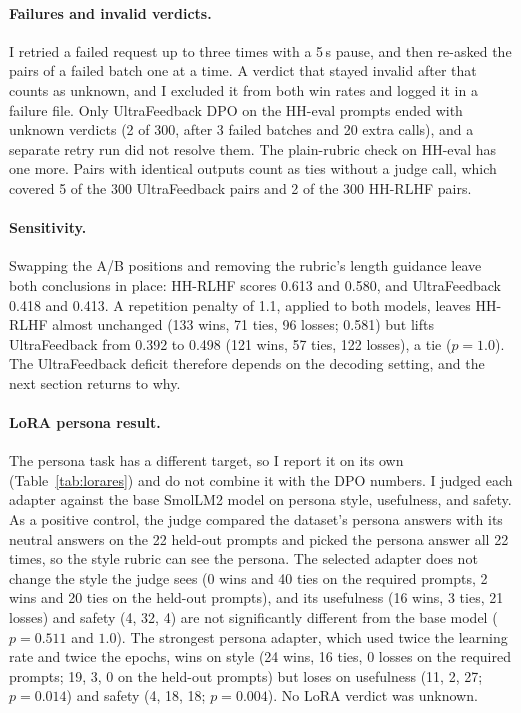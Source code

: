 \paragraph{Failures and invalid verdicts.} I retried a failed request up to three times with a 5\,s pause, and then re-asked the pairs of a failed batch one at a time. A verdict that stayed invalid after that counts as unknown, and I excluded it from both win rates and logged it in a failure file. Only UltraFeedback DPO on the HH-eval prompts ended with unknown verdicts (2 of 300, after 3 failed batches and 20 extra calls), and a separate retry run did not resolve them. The plain-rubric check on HH-eval has one more. Pairs with identical outputs count as ties without a judge call, which covered 5 of the 300 UltraFeedback pairs and 2 of the 300 HH-RLHF pairs.

\paragraph{Sensitivity.} Swapping the A/B positions and removing the rubric's length guidance leave both conclusions in place: HH-RLHF scores 0.613 and 0.580, and UltraFeedback 0.418 and 0.413. A repetition penalty of 1.1, applied to both models, leaves HH-RLHF almost unchanged (133 wins, 71 ties, 96 losses; 0.581) but lifts UltraFeedback from 0.392 to 0.498 (121 wins, 57 ties, 122 losses), a tie ($p=1.0$). The UltraFeedback deficit therefore depends on the decoding setting, and the next section returns to why.

\paragraph{LoRA persona result.} The persona task has a different target, so I report it on its own (Table~\ref{tab:lorares}) and do not combine it with the DPO numbers. I judged each adapter against the base SmolLM2 model on persona style, usefulness, and safety. As a positive control, the judge compared the dataset's persona answers with its neutral answers on the 22 held-out prompts and picked the persona answer all 22 times, so the style rubric can see the persona. The selected adapter does not change the style the judge sees (0 wins and 40 ties on the required prompts, 2 wins and 20 ties on the held-out prompts), and its usefulness (16 wins, 3 ties, 21 losses) and safety (4, 32, 4) are not significantly different from the base model ($p=0.511$ and $1.0$). The strongest persona adapter, which used twice the learning rate and twice the epochs, wins on style (24 wins, 16 ties, 0 losses on the required prompts; 19, 3, 0 on the held-out prompts) but loses on usefulness (11, 2, 27; $p=0.014$) and safety (4, 18, 18; $p=0.004$). No LoRA verdict was unknown.

\begin{table}[!t]
\centering
\caption{LoRA persona results, each adapter against the base SmolLM2 model, one rubric per target. Table~\ref{tab:dpo} defines the columns.}
\label{tab:lorares}

\end{table}
